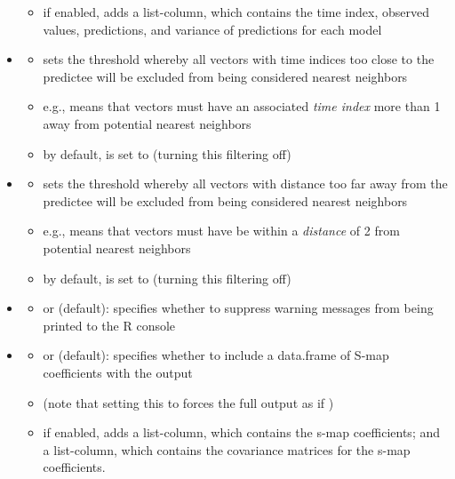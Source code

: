 \documentclass[article]{jss}
\begin{document}
\begin{itemize}
\begin{itemize}
  \item if enabled, adds a  list-column, which contains the time index, observed values, predictions, and variance of predictions for each model
  \end{itemize}
\item {}
  \begin{itemize}
  \item {} sets the threshold whereby all vectors with time indices too close to the predictee will be excluded from being considered nearest neighbors
  \item e.g.,  means that vectors must have an associated \emph{time index} more than 1 away from potential nearest neighbors
  \item by default,  is set to  (turning this filtering off)
  \end{itemize}
\item {}
  \begin{itemize}
  \item {} sets the threshold whereby all vectors with distance too far away from the predictee will be excluded from being considered nearest neighbors
  \item e.g.,  means that vectors must have be within a \emph{distance} of 2 from potential nearest neighbors
  \item by default,  is set to  (turning this filtering off)
  \end{itemize}
\item {}
  \begin{itemize}
  \item {} or  (default): specifies whether to suppress warning messages from being printed to the R console
  \end{itemize}
\item {}
  \begin{itemize}
  \item {} or  (default): specifies whether to include a data.frame of S-map coefficients with the output
  \item (note that setting this to  forces the full output as if )
  \item if enabled, adds a  list-column, which contains the s-map coefficients; and a  list-column, which contains the covariance matrices for the s-map coefficients.
  \end{itemize}
\end{itemize}
\end{document}
